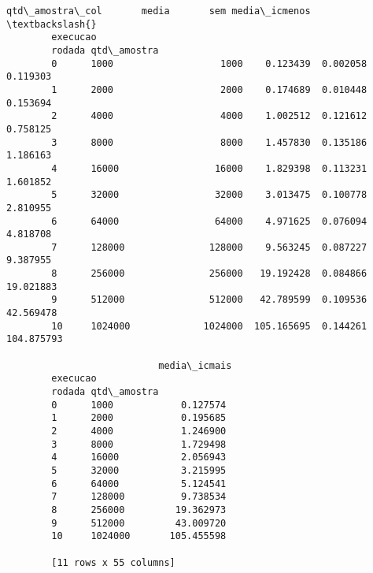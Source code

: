 \documentclass[11pt]{article}
\begin{document}
\begin{Verbatim}[commandchars=\\\{\}]
                           qtd\_amostra\_col       media       sem media\_icmenos  \textbackslash{}
        execucao                                                                 
        rodada qtd\_amostra                                                       
        0      1000                   1000    0.123439  0.002058      0.119303   
        1      2000                   2000    0.174689  0.010448      0.153694   
        2      4000                   4000    1.002512  0.121612      0.758125   
        3      8000                   8000    1.457830  0.135186      1.186163   
        4      16000                 16000    1.829398  0.113231      1.601852   
        5      32000                 32000    3.013475  0.100778      2.810955   
        6      64000                 64000    4.971625  0.076094      4.818708   
        7      128000               128000    9.563245  0.087227      9.387955   
        8      256000               256000   19.192428  0.084866     19.021883   
        9      512000               512000   42.789599  0.109536     42.569478   
        10     1024000             1024000  105.165695  0.144261    104.875793   
        
                           media\_icmais  
        execucao                         
        rodada qtd\_amostra               
        0      1000            0.127574  
        1      2000            0.195685  
        2      4000            1.246900  
        3      8000            1.729498  
        4      16000           2.056943  
        5      32000           3.215995  
        6      64000           5.124541  
        7      128000          9.738534  
        8      256000         19.362973  
        9      512000         43.009720  
        10     1024000       105.455598  
        
        [11 rows x 55 columns]
\end{Verbatim}
            
\end{document}
